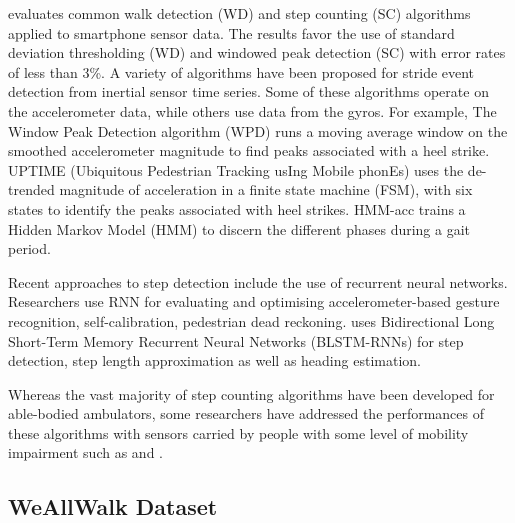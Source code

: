 \documentclass[11pt]{article}
\begin{document}
{\cite{brajdic2013walk} evaluates common walk detection (WD) and step counting (SC) algorithms applied to smartphone sensor data. The results favor the use of standard deviation thresholding (WD) and windowed peak detection (SC) with error rates of less than 3\%.
A variety of algorithms have been proposed for stride event detection from inertial sensor time series. Some of these algorithms operate on the accelerometer data, while others use data from the gyros. For example, The Window Peak Detection algorithm (WPD) runs a moving average window on the smoothed accelerometer magnitude to find peaks associated with a heel strike. \cite{alzantot2012uptime} UPTIME (Ubiquitous Pedestrian Tracking usIng Mobile phonEs) uses the de-trended magnitude of acceleration in a finite state machine (FSM), with six states to identify the peaks associated with heel strikes. \cite{mannini2011hidden} HMM-acc trains a Hidden Markov Model (HMM) to discern the different phases during a gait period. 


Recent approaches to step detection include the use of recurrent neural networks. Researchers use RNN for evaluating and optimising accelerometer-based gesture recognition, self-calibration, pedestrian dead reckoning.
\cite{edel2015advanced} uses Bidirectional Long Short-Term Memory Recurrent Neural Networks (BLSTM-RNNs) for step detection, step length approximation as well as heading estimation.

Whereas the vast majority of step counting algorithms have been developed for able-bodied ambulators, some researchers have addressed the performances of these algorithms with sensors carried by people with some level of mobility impairment such as \cite{haegele2015validation} and \cite{holbrook2011validation}. 



\subsection{WeAllWalk Dataset}

}
\end{document}
